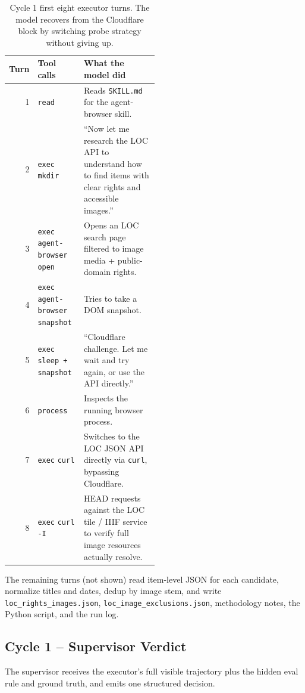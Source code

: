 \begin{table}[h]
\centering
\small
\begin{tabular}{rlp{0.50\linewidth}}
\toprule
Turn & Tool calls & What the model did \\
\midrule
1 & \texttt{read} & Reads \texttt{SKILL.md} for the agent-browser skill. \\
2 & \texttt{exec} \texttt{mkdir} & ``Now let me research the LOC API to understand how to find items with clear rights and accessible images.'' \\
3 & \texttt{exec} \texttt{agent-browser open} & Opens an LOC search page filtered to image media + public-domain rights. \\
4 & \texttt{exec} \texttt{agent-browser snapshot} & Tries to take a DOM snapshot. \\
5 & \texttt{exec} \texttt{sleep + snapshot} & ``Cloudflare challenge. Let me wait and try again, or use the API directly.'' \\
6 & \texttt{process} & Inspects the running browser process. \\
7 & \texttt{exec} \texttt{curl} & Switches to the LOC JSON API directly via \texttt{curl}, bypassing Cloudflare. \\
8 & \texttt{exec} \texttt{curl -I} & HEAD requests against the LOC tile / IIIF service to verify full image resources actually resolve. \\
\bottomrule
\end{tabular}
\vspace{5pt}
\caption{Cycle 1 first eight executor turns. The model recovers from the Cloudflare block by switching probe strategy without giving up.}\label{tbl:case:trace1}
\end{table}

The remaining turns (not shown) read item-level JSON for each
candidate, normalize titles and dates, dedup by image stem, and write
\texttt{loc\_rights\_images.json}, \texttt{loc\_image\_exclusions.json},
methodology notes, the Python script, and the run log.

\subsection{Cycle 1 -- Supervisor Verdict}\label{app:case-study:verdict1}

The supervisor receives the executor's full visible trajectory plus
the hidden eval rule and ground truth, and emits one structured
decision.

